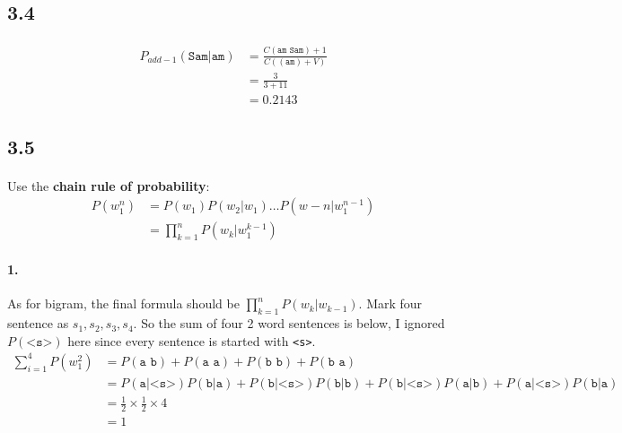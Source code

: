 \documentclass{article}
\begin{document}
\subsection*{3.4}

\paragraph{}
\begin{align*}
    P_{add-1}(\texttt{Sam|am}) & = \frac{C(\texttt{am Sam}) + 1}{C((\texttt{am}) + V)} \\
                               & = \frac{3}{3 + 11}                                    \\
                               & = 0.2143
\end{align*}

\subsection*{3.5}

\paragraph{}
Use the \textbf{chain rule of probability}:
\begin{align*}
    P(w_1^n) & = P(w_1)P(w_2|w_1) \dots P(w-n|w_1^{n-1}) \\
             & = \prod_{k=1}^{n} P(w_k|w_1^{k-1})
\end{align*}

\paragraph{1.}
As for bigram, the final formula should be $\prod_{k=1}^{n} P(w_k|w_{k-1})$.
Mark four sentence as $s_1, s_2, s_3, s_4$.
So the sum of four 2 word sentences is below, I ignored $P(\texttt{<s>})$
here since every sentence is started with \texttt{<s>}.
\begin{align*}
    \sum_{i=1}^{4}P(w_1^2) & = P(\texttt{a b}) + P(\texttt{a a}) + P(\texttt{b b}) + P(\texttt{b a}) \\
                           & = P(\texttt{a|<s>})P(\texttt{b|a}) + P(\texttt{b|<s>})P(\texttt{b|b})
    + P(\texttt{b|<s>})P(\texttt{a|b}) + P(\texttt{a|<s>})P(\texttt{b|a})                            \\
                           & = \frac{1}{2} \times \frac{1}{2} \times 4                               \\
                           & = 1
\end{align*}
\end{document}
